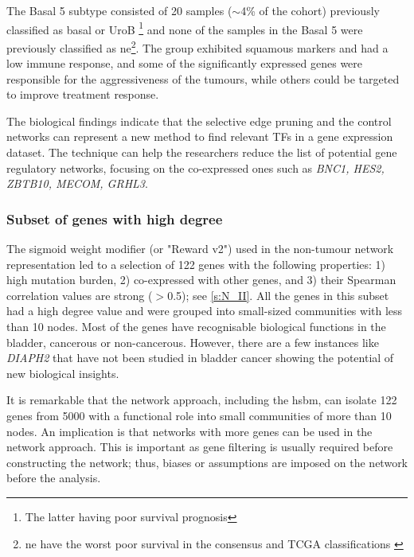 The Basal 5 subtype consisted of 20 samples ($\sim$4\% of the cohort) previously classified as basal \citep{Kamoun2020-tj,Robertson2017-mg} or UroB \citep{Marzouka2018-ge}\footnote{The latter having poor survival prognosis} and none of the samples in the Basal 5 were previously classified as \acrlong{ne}\footnote{\acrlong{ne} have the worst poor survival in the consensus and TCGA classifications \citep{Kamoun2020-tj,Robertson2017-mg}}. The group exhibited squamous markers and had a low immune response, and some of the significantly expressed genes were responsible for the aggressiveness of the tumours, while others could be targeted to improve treatment response.

The biological findings indicate that the selective edge pruning and the control networks can represent a new method to find relevant \gls{TF}s in a gene expression dataset. The technique can help the researchers reduce the list of potential gene regulatory networks, focusing on the co-expressed ones such as \textit{BNC1, HES2, ZBTB10, MECOM, GRHL3}.

\subsubsection*{Subset of genes with high degree}

The sigmoid weight modifier (or "Reward v2") used in the non-tumour network representation led to a selection of 122 genes with the following properties: 1) high mutation burden, 2) co-expressed with other genes, and 3) their Spearman correlation values are strong (\(>\)0.5); see \cref{s:N_II}. All the genes in this subset had a high degree value and were grouped into small-sized communities with less than 10 nodes. Most of the genes have recognisable biological functions in the bladder, cancerous or non-cancerous. However, there are a few instances like \textit{DIAPH2} that have not been studied in bladder cancer showing the potential of new biological insights.

It is remarkable that the network approach, including the \acrshort{hsbm}, can isolate 122 genes from 5000 with a functional role into small communities of more than 10 nodes. An implication is that networks with more genes can be used in the network approach. This is important as gene filtering is usually required before constructing the network; thus, biases or assumptions are imposed on the network before the analysis.

